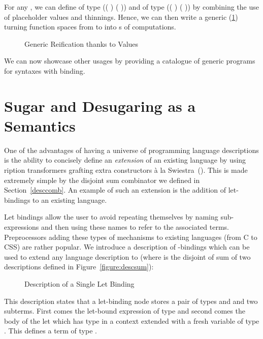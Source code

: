 For any  , we can define  of
type {(( )  ( \AF{++} ))} and  of
type {(( )  ( \AF{++} ))} by combining the use
of placeholder values and thinnings. Hence, we can then write a generic 
(\cref{fig:kripkereify}) turning  function spaces from  to 
into s of  computations.

\begin{figure}[h]
\caption{Generic Reification thanks to  Values\label{fig:kripkereify}}
\end{figure}

We can now showcase other usages by providing a catalogue of generic programs
for syntaxes with binding.

\section{Sugar and Desugaring as a Semantics}\label{section:letbinding}

One of the advantages of having a universe of programming language
descriptions is the ability to concisely define an \emph{extension}
of an existing language by using ription transformers
grafting extra constructors à la Swiestra~(\citeyear{swierstra_2008}).
This is made extremely simple by the
disjoint sum combinator  we defined in Section~\ref{desccomb}.
An example of such an extension is the addition of let-bindings to
an existing language.

Let bindings allow the user to avoid repeating themselves by naming
sub-expressions and then using these names to refer to the associated
terms. Preprocessors adding these types of mechanisms to existing
languages (from C to CSS) are rather popular. We introduce a
description of -bindings which can be used to extend any
language description  to    (where 
is the disjoint of sum of two descriptions defined in Figure~\ref{figure:descsum}):

\begin{figure}[h]
\caption{Description of a Single Let Binding}
\end{figure}

This description states that a let-binding node stores a pair of types
\AB{$\sigma$} and \AB{$\tau$} and two subterms. First comes the let-bound
expression of type \AB{$\sigma$} and second comes the body of the let which
has type \AB{$\tau$} in a context extended with a fresh variable of type
\AB{$\sigma$}. This defines a term of type \AB{$\tau$}.

